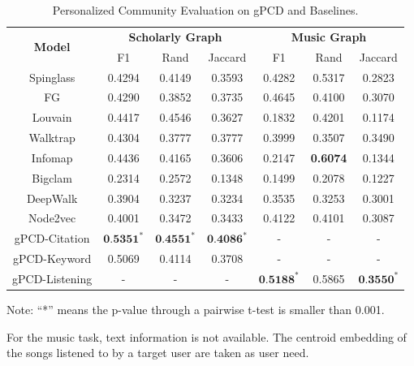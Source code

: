 \begin{table}[h]
	 \centering
	
	\begin{tabular}{|c|c|c|c|c|c|c|} 
		\hline
		\multirow{2}{*}{\textbf{Model}} & \multicolumn{3}{c|}{\textbf{Scholarly Graph}} 	&\multicolumn{3}{c|}{\textbf{Music Graph}}\\
		\cline{2-7}%
		& F1 & Rand	& Jaccard	& F1 & Rand	& Jaccard\\  \hline
		Spinglass&0.4294 & 0.4149 &0.3593 & 0.4282 & 0.5317& 0.2823 \\ 
		FG& 0.4290 & 0.3852& 0.3735 &0.4645&0.4100& 0.3070 \\ 
		Louvain&0.4417 & 0.4546& 0.3627&0.1832 &0.4201 & 0.1174 \\ 
		Walktrap& 0.4304 & 0.3777 & 0.3777&0.3999 & 0.3507& 0.3490 \\
		Infomap&0.4436 & 0.4165& 0.3606& 0.2147 & \textbf{0.6074} &0.1344\\ 
		Bigclam& 0.2314  & 0.2572 & 0.1348 & 0.1499  & 0.2078  & 0.1227 \\
		DeepWalk&0.3904 & 0.3237 & 0.3234&0.3535& 0.3253& 0.3001 \\ 
		Node2vec & 0.4001 & 0.3472 & 0.3433&0.4122 & 0.4101& 0.3087 \\  \hline
		gPCD-Citation&$\textbf{0.5351}^{*}$ & $\textbf{0.4551}^{*}$& $\textbf{0.4086}^{*}$ &-	&-	& -\\
		gPCD-Keyword&0.5069 & 0.4114& 0.3708 &-	&-	& - \\
		gPCD-Listening&-	&-	& - &$\textbf{0.5188}^{*} $& 0.5865& $\textbf{0.3550}^{*} $\\ 
	\hline
	\end{tabular}
	\begin{tablenotes}
		\item[] \begin{footnotesize}
			Note: ``*'' means the p-value through a pairwise t-test is smaller than 0.001.
		\end{footnotesize}
	\end{tablenotes}
	\caption{Personalized Community Evaluation on gPCD and Baselines. }
	\label{tab:community}
\end{table}


For the music task, text information is not available. The centroid embedding of the songs listened to by a target user are taken as user need.

